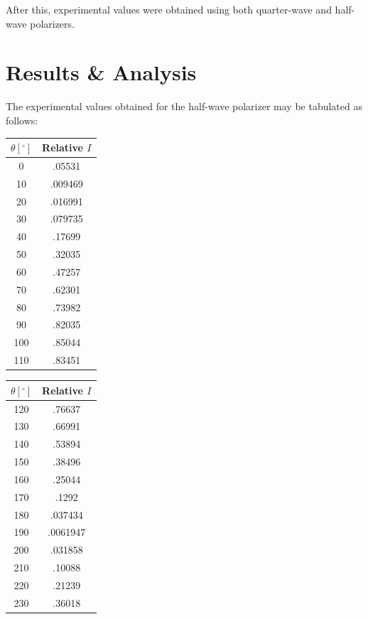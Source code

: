 \documentclass[
	letterpaper, %
	10pt, %
]{CSUniSchoolLabReport}
\begin{document}
After this, experimental values were obtained using both quarter-wave and half-wave polarizers.

\section{Results \& Analysis} 

The experimental values obtained for the half-wave polarizer may be tabulated as follows:

\begin{multicols}{3}

\begin{center}
  \begin{tabular}[H]{|c|c|}
    \hline
    $\theta[^{\circ}]$ & Relative $I$\\
    \hline
    0 & .05531\\
    \hline
    10 & .009469\\
    \hline
    20 & .016991\\
    \hline
    30 & .079735\\
    \hline
    40 & .17699\\
    \hline
    50 & .32035\\
    \hline
    60 & .47257\\
    \hline
    70 & .62301\\
    \hline
    80 & .73982\\
    \hline
    90 & .82035\\
    \hline
    100 & .85044\\
    \hline
    110 & .83451\\
    \hline
  \end{tabular}
\end{center}

\begin{center}
  \begin{tabular}[H]{|c|c|}
    \hline
    $\theta[^{\circ}]$ & Relative $I$\\
    \hline
    120 & .76637\\
    \hline
    130 & .66991\\
    \hline
    140 & .53894\\
    \hline
    150 & .38496\\
    \hline
    160 & .25044\\
    \hline
    170 & .1292\\
    \hline
    180 & .037434\\
    \hline
    190 & .0061947\\
    \hline
    200 & .031858\\
    \hline
    210 & .10088\\
    \hline
    220 & .21239\\
    \hline
    230 & .36018\\
    \hline
  \end{tabular}
\end{center}


\end{multicols}
\end{document}
